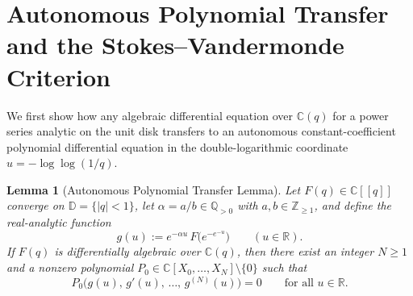 \documentclass[10pt,reqno]{amsart}
\numberwithin{equation}{section}
\newtheorem{lemma}[proposition]{Lemma}
\theoremstyle{definition}
\newcommand{\Z}{\mathbb{Z}}
\newcommand{\Q}{\mathbb{Q}}
\newcommand{\R}{\mathbb{R}}
\newcommand{\C}{\mathbb{C}}
\newcommand{\D}{\mathbb{D}}
\begin{document}
\section{Autonomous Polynomial Transfer and the Stokes--Vandermonde Criterion}\label{sec:sv}

We first show how any algebraic differential equation over $\C(q)$ for a power series analytic on the unit disk transfers to an autonomous constant-coefficient polynomial differential equation in the double-logarithmic coordinate $u = -\log\log(1/q)$.

\begin{lemma}[Autonomous Polynomial Transfer Lemma]\label{lem:transfer}
Let $F(q) \in \C[[q]]$ converge on $\D = \{|q| < 1\}$, let $\alpha = a/b \in \Q_{>0}$ with $a,b \in \Z_{\ge 1}$, and define the real-analytic function
\[
  g(u) := e^{-\alpha u}\, F\bigl(e^{-e^{-u}}\bigr) \qquad (u \in \R).
\]
If $F(q)$ is differentially algebraic over $\C(q)$, then there exist an integer $N \ge 1$ and a nonzero polynomial $P_0 \in \C[X_0, \dots, X_N] \setminus \{0\}$ such that
\begin{equation}\label{eq:transfer-ode}
  P_0\bigl(g(u),\, g'(u),\, \dots,\, g^{(N)}(u)\bigr) = 0 \qquad \text{for all } u \in \R.
\end{equation}
\end{lemma}
\end{document}
